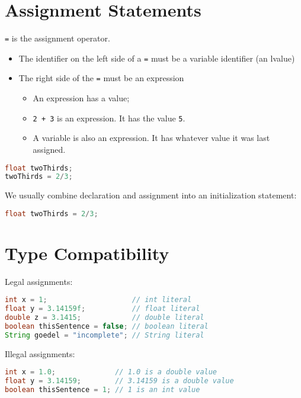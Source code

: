 \documentclass{article}
\begin{document}
\section{Assignment Statements}


{\tt =} is the assignment operator.
\begin{itemize}
\item The identifier on the left side of a {\tt =} must be a variable identifier (an lvalue)
\item The right side of the {\tt =} must be an expression
\begin{itemize}
\item An expression has a value;
\item {\tt 2 + 3} is an expression.  It has the value {\tt 5}.
\item A variable is also an expression.  It has whatever value it was last assigned.
\end{itemize}

\end{itemize}

\begin{lstlisting}[language=Java]
float twoThirds;
twoThirds = 2/3;
\end{lstlisting}
We usually combine declaration and assignment into an initialization statement:
\begin{lstlisting}[language=Java]
float twoThirds = 2/3;
\end{lstlisting}





\section{Type Compatibility}


Legal assignments:
\begin{lstlisting}[language=Java]
int x = 1;                    // int literal
float y = 3.14159f;           // float literal
double z = 3.1415;            // double literal
boolean thisSentence = false; // boolean literal
String goedel = "incomplete"; // String literal
\end{lstlisting}

Illegal assignments:
\begin{lstlisting}[language=Java]
int x = 1.0;              // 1.0 is a double value
float y = 3.14159;        // 3.14159 is a double value
boolean thisSentence = 1; // 1 is an int value
\end{lstlisting}
\end{document}
